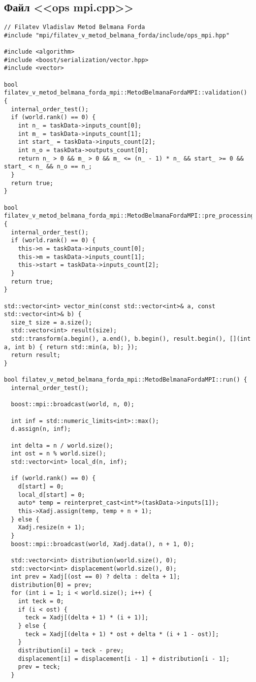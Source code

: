 \documentclass[a4paper, 14pt]{article}
\begin{document}
	\subsection*{\centering Файл <<ops mpi.cpp>>}
	\begin{verbatim}
// Filatev Vladislav Metod Belmana Forda
#include "mpi/filatev_v_metod_belmana_forda/include/ops_mpi.hpp"

#include <algorithm>
#include <boost/serialization/vector.hpp>
#include <vector>

bool filatev_v_metod_belmana_forda_mpi::MetodBelmanaFordaMPI::validation() {
  internal_order_test();
  if (world.rank() == 0) {
    int n_ = taskData->inputs_count[0];
    int m_ = taskData->inputs_count[1];
    int start_ = taskData->inputs_count[2];
    int n_o = taskData->outputs_count[0];
    return n_ > 0 && m_ > 0 && m_ <= (n_ - 1) * n_ && start_ >= 0 && start_ < n_ && n_o == n_;
  }
  return true;
}

bool filatev_v_metod_belmana_forda_mpi::MetodBelmanaFordaMPI::pre_processing() {
  internal_order_test();
  if (world.rank() == 0) {
    this->n = taskData->inputs_count[0];
    this->m = taskData->inputs_count[1];
    this->start = taskData->inputs_count[2];
  }
  return true;
}

std::vector<int> vector_min(const std::vector<int>& a, const std::vector<int>& b) {
  size_t size = a.size();
  std::vector<int> result(size);
  std::transform(a.begin(), a.end(), b.begin(), result.begin(), [](int a, int b) { return std::min(a, b); });
  return result;
}

bool filatev_v_metod_belmana_forda_mpi::MetodBelmanaFordaMPI::run() {
  internal_order_test();

  boost::mpi::broadcast(world, n, 0);

  int inf = std::numeric_limits<int>::max();
  d.assign(n, inf);

  int delta = n / world.size();
  int ost = n % world.size();
  std::vector<int> local_d(n, inf);

  if (world.rank() == 0) {
    d[start] = 0;
    local_d[start] = 0;
    auto* temp = reinterpret_cast<int*>(taskData->inputs[1]);
    this->Xadj.assign(temp, temp + n + 1);
  } else {
    Xadj.resize(n + 1);
  }
  boost::mpi::broadcast(world, Xadj.data(), n + 1, 0);

  std::vector<int> distribution(world.size(), 0);
  std::vector<int> displacement(world.size(), 0);
  int prev = Xadj[(ost == 0) ? delta : delta + 1];
  distribution[0] = prev;
  for (int i = 1; i < world.size(); i++) {
    int teck = 0;
    if (i < ost) {
      teck = Xadj[(delta + 1) * (i + 1)];
    } else {
      teck = Xadj[(delta + 1) * ost + delta * (i + 1 - ost)];
    }
    distribution[i] = teck - prev;
    displacement[i] = displacement[i - 1] + distribution[i - 1];
    prev = teck;
  }


\end{verbatim}
\end{document}
